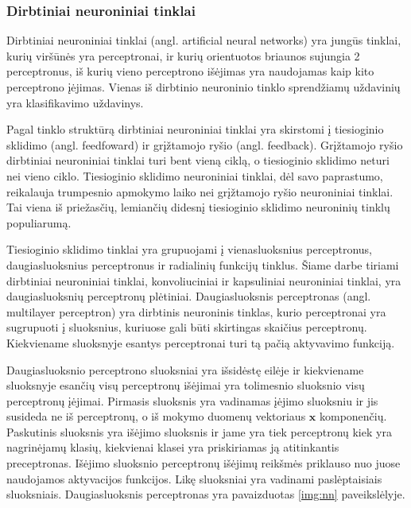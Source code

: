 \subsubsection{Dirbtiniai neuroniniai tinklai}

Dirbtiniai neuroniniai tinklai (angl. artificial neural networks) yra jungūs tinklai, kurių viršūnės yra perceptronai, ir kurių orientuotos briaunos sujungia 2 perceptronus, iš kurių vieno perceptrono išėjimas yra naudojamas kaip kito perceptrono įėjimas. Vienas iš dirbtinio neuroninio tinklo sprendžiamų uždavinių yra klasifikavimo uždavinys.

Pagal tinklo struktūrą dirbtiniai neuroniniai tinklai yra skirstomi į tiesioginio sklidimo (angl. feedfoward) ir grįžtamojo ryšio (angl. feedback). Grįžtamojo ryšio dirbtiniai neuroniniai tinklai turi bent vieną ciklą, o tiesioginio sklidimo neturi nei vieno ciklo. Tiesioginio sklidimo neuroniniai tinklai, dėl savo paprastumo, reikalauja trumpesnio apmokymo laiko nei grįžtamojo ryšio neuroniniai tinklai. Tai viena iš priežasčių, lemiančių didesnį tiesioginio sklidimo neuroninių tinklų populiarumą.

Tiesioginio sklidimo tinklai yra grupuojami į vienasluoksnius perceptronus, daugiasluoksnius perceptronus ir radialinių funkcijų tinklus. Šiame darbe tiriami dirbtiniai neuroniniai tinklai, konvoliuciniai ir kapsuliniai neuroniniai tinklai, yra daugiasluoksnių perceptronų plėtiniai. Daugiasluoksnis perceptronas (angl. multilayer perceptron) yra dirbtinis neuroninis tinklas, kurio perceptronai yra sugrupuoti į sluoksnius, kuriuose gali būti skirtingas skaičius perceptronų. Kiekviename sluoksnyje esantys perceptronai turi tą pačią aktyvavimo funkciją.

Daugiasluoksnio perceptrono sluoksniai yra išsidėstę eilėje ir kiekviename sluoksnyje esančių visų perceptronų išėjimai yra tolimesnio sluoksnio visų perceptronų įėjimai. Pirmasis sluoksnis  yra vadinamas įėjimo sluoksniu ir jis susideda ne iš perceptronų, o iš mokymo duomenų vektoriaus $\boldsymbol{x}$ komponenčių. Paskutinis sluoksnis yra išėjimo sluoksnis ir jame yra tiek perceptronų kiek yra nagrinėjamų klasių, kiekvienai klasei yra priskiriamas ją atitinkantis preceptronas. Išėjimo sluoksnio perceptronų išėjimų reikšmės priklauso nuo juose naudojamos aktyvacijos funkcijos. Likę sluoksniai yra vadinami paslėptaisiais sluoksniais. Daugiasluoksnis perceptronas yra pavaizduotas \ref{img:nn} paveikslėlyje.

